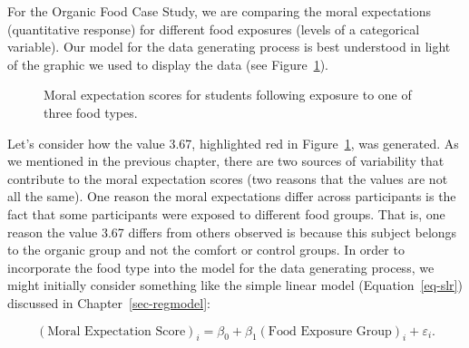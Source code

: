 \documentclass[
  letterpaper,
  DIV=11,
  numbers=noendperiod]{scrreprt}
\theoremstyle{definition}
\theoremstyle{definition}
\theoremstyle{plain}
\theoremstyle{remark}
\begin{document}
For the Organic Food Case Study, we are comparing the moral expectations
(quantitative response) for different food exposures (levels of a
categorical variable). Our model for the data generating process is best
understood in light of the graphic we used to display the data (see
Figure~\ref{fig-anovamodel-organic-plot}).

\begin{figure}


\caption{\label{fig-anovamodel-organic-plot}Moral expectation scores for
students following exposure to one of three food types.}

\end{figure}%

Let's consider how the value 3.67, highlighted red in
Figure~\ref{fig-anovamodel-organic-plot}, was generated. As we mentioned
in the previous chapter, there are two sources of variability that
contribute to the moral expectation scores (two reasons that the values
are not all the same). One reason the moral expectations differ across
participants is the fact that some participants were exposed to
different food groups. That is, one reason the value 3.67 differs from
others observed is because this subject belongs to the organic group and
not the comfort or control groups. In order to incorporate the food type
into the model for the data generating process, we might initially
consider something like the simple linear model (Equation~\ref{eq-slr})
discussed in Chapter~\ref{sec-regmodel}:

\[(\text{Moral Expectation Score})_i = \beta_0 + \beta_1 (\text{Food Exposure Group})_i + \varepsilon_i.\]
\end{document}
